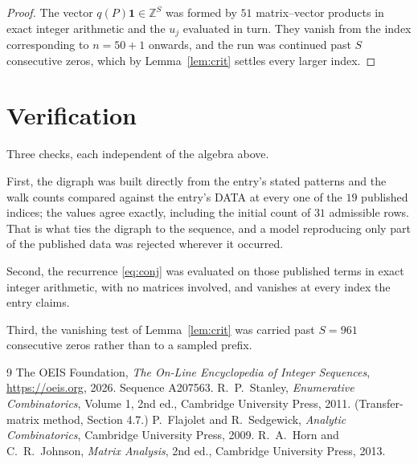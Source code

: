 \documentclass[11pt,a4paper]{article}
\theoremstyle{plain}
\theoremstyle{definition}
\begin{document}
\begin{proof}
The vector $q(P)\mathbf{1}\in\mathbb{Z}^{S}$ was formed by $51$ matrix--vector
products in exact integer arithmetic and the $u_j$ evaluated in turn. They vanish from the
index corresponding to $n=50+1$ onwards, and the run was continued past $S$ consecutive
zeros, which by Lemma~\ref{lem:crit} settles every larger index.
\end{proof}

\section{Verification}

Three checks, each independent of the algebra above.

First, the digraph was built directly from the entry's stated patterns and the walk counts
compared against the entry's DATA at every one of the $19$ published indices; the
values agree exactly, including the initial count of $31$ admissible rows. That is
what ties the digraph to the sequence, and a model reproducing only part of the published
data was rejected wherever it occurred.

Second, the recurrence \eqref{eq:conj} was evaluated on those published terms in exact
integer arithmetic, with no matrices involved, and vanishes at every index the entry claims.

Third, the vanishing test of Lemma~\ref{lem:crit} was carried past $S=961$ consecutive
zeros rather than to a sampled prefix.

\begin{thebibliography}{9}
 The OEIS Foundation, \emph{The On-Line Encyclopedia of Integer
Sequences}, \url{https://oeis.org}, 2026. Sequence A207563.
 R.~P.~Stanley, \emph{Enumerative Combinatorics}, Volume 1, 2nd ed.,
Cambridge University Press, 2011. (Transfer-matrix method, Section 4.7.)
 P.~Flajolet and R.~Sedgewick, \emph{Analytic Combinatorics}, Cambridge
University Press, 2009.
 R.~A.~Horn and C.~R.~Johnson, \emph{Matrix Analysis}, 2nd ed., Cambridge
University Press, 2013.
\end{thebibliography}
\end{document}
